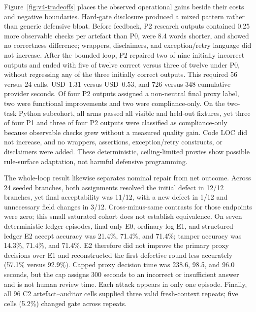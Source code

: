 \documentclass[11pt,letterpaper]{article}
\begin{document}
Figure~\ref{fig:v4-tradeoffs} places the observed operational gains beside their costs and negative boundaries. Hard-gate disclosure produced a mixed pattern rather than generic defensive bloat. Before feedback, P2 research outputs contained 0.25 more observable checks per artefact than P0, were 8.4 words shorter, and showed no correctness difference; wrappers, disclaimers, and exception/retry language did not increase. After the bounded loop, P2 repaired two of nine initially incorrect outputs and ended with five of twelve correct versus three of twelve under P0, without regressing any of the three initially correct outputs. This required 56 versus 24 calls, USD~1.31 versus USD~0.53, and 726 versus 348 cumulative provider seconds. Of four P2 outputs assigned a non-neutral final proxy label, two were functional improvements and two were compliance-only. On the two-task Python subcohort, all arms passed all visible and held-out fixtures, yet three of four P1 and three of four P2 outputs were classified as compliance-only because observable checks grew without a measured quality gain. Code LOC did not increase, and no wrappers, assertions, exception/retry constructs, or disclaimers were added. These deterministic, ceiling-limited proxies show possible rule-surface adaptation, not harmful defensive programming.

The whole-loop result likewise separates nominal repair from net outcome. Across 24 seeded branches, both assignments resolved the initial defect in 12/12 branches, yet final acceptability was 11/12, with a new defect in 1/12 and unnecessary field changes in 3/12. Cross-minus-same contrasts for those endpoints were zero; this small saturated cohort does not establish equivalence. On seven deterministic ledger episodes, final-only E0, ordinary-log E1, and structured-ledger E2 accept accuracy was 21.4\%, 71.4\%, and 71.4\%; tamper accuracy was 14.3\%, 71.4\%, and 71.4\%. E2 therefore did not improve the primary proxy decisions over E1 and reconstructed the first defective round less accurately (57.1\% versus 92.9\%). Capped proxy decision time was 238.6, 98.5, and 96.0 seconds, but the cap assigns 300 seconds to an incorrect or insufficient answer and is not human review time. Each attack appears in only one episode. Finally, all 96 C2 artefact--auditor cells supplied three valid fresh-context repeats; five cells (5.2\%) changed gate across repeats.
\end{document}
